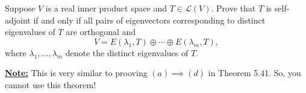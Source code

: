 \documentclass[answers]{exam}
\renewcommand{\L}[1]{\mathcal{L}\left(#1\right)}
\begin{document}
\begin{questions}
    \question Suppose $V$ is a real inner product space and $T\in\L{V}$. Prove that $T$ is self-adjoint if and
    only if all pairs of eigenvectors corresponding to distinct eigenvalues of $T$ are orthogonal and 
    \[
        V = E(\lambda_1,T)\oplus \cdots \oplus E(\lambda_m,T),
    \]
    where $\lambda_1,\dots,\lambda_m$ denote the distinct eigenvalues of $T$.

    \textbf{\underline{Note:}} This is very similar to prooving $(a)\implies (d)$ in Theorem 5.41. So, you 
    cannot use this theorem!
\end{questions}
\newpage
\end{document}

